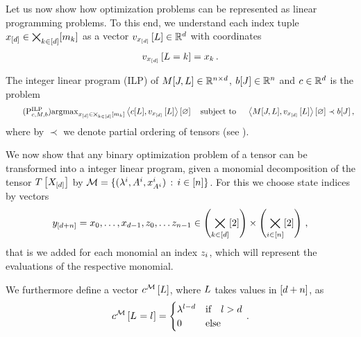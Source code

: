
Let us now show how optimization problems can be represented as linear programming problems.
To this end, we understand each index tuple $x_{[d]}\in\bigtimes_{k\in[d]}[m_{k}]$ as a vector $v_{x_{[d]}}\left[L\right]\in\mathbb{R}^{d}$ with coordinates
\begin{align*}
    v_{x_{[d]}}\left[L=k\right] = x_{k} \, .
\end{align*}

\begin{definition}
    The integer linear program (ILP) of $M[J,L]\in\mathbb{R}^{n \times d}$, $b[J]\in\mathbb{R}^{n}$ and $c\in\mathbb{R}^{d}$ is the problem
    \begin{align}
        \tag{$\probtagtypeinst{\mathrm{ILP}}{\objectivesymbol,\exmatrix,\rhssymbol}$}
        \argmax_{\shortcatindices\in\facstates} \sbcontraction{\objectivesymbol[\selvariable], \statevectorofat{\shortcatindices}{\selvariable}}
        \quad \text{subject to } \quad \sbcontraction{\matrixat{\datvariable,\selvariable},\statevectorofat{\shortcatindices}{\selvariable}} \prec \rhssymbol[\datvariable] \, ,
    \end{align}
    where by $\prec$ we denote partial ordering of tensors (see ).
\end{definition}


We now show that any binary optimization problem of a tensor can be transformed into a integer linear program, given a monomial decomposition of the tensor $T\left[X_{[d]}\right]$ by $\mathcal{M}=\{(\lambda^{i}, A^{i}, x_{A^{i}}^{i}) \, : \, i\in[n]\}$.
For this we choose state indices by vectors
\begin{align*}
    y_{[d+n]} = x_{0},\ldots,x_{d-1},z_{0},\ldots z_{n-1} \in \left(\bigtimes_{k\in[d]}[2]\right) \times  \left(\bigtimes_{i\in[n]}[2]\right) \, ,
\end{align*}
that is we added for each monomial an index $z_{i}$, which will represent the evaluations of the respective monomial.


We furthermore define a vector $c^{\mathcal{M}}\left[L\right]$, where $L$ takes values in $[d+n]$, as
\begin{align}
    \label{eq:ilpPotential}
    \objofat{\sliceset}{\indexedselvariable} =
    \begin{cases}
        \slicescalarof{\selindex-\catorder} & \text{if} \quad \selindex>\catorder \\%
        0 & \text{else}
    \end{cases} \, .
\end{align}

